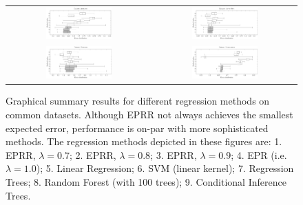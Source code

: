 \documentclass[review,preprint]{elsarticle}
\begin{document}
%
\begin{figure}[tb]\begin{center}
\begin{tabular}{cc}
\includegraphics[width=0.48\textwidth]{Fig3a.pdf}
&
\includegraphics[width=0.48\textwidth]{Fig3b.pdf}
\\
\includegraphics[width=0.48\textwidth]{Fig3c.pdf}
&
\includegraphics[width=0.48\textwidth]{Fig3d.pdf}
\end{tabular}
%
\caption{Graphical summary results for different regression methods on common datasets. Although \ac{EPRR} not always achieves the smallest expected error, performance is on-par with more sophisticated methods.  The regression methods depicted in these figures are:
1. \ac{EPRR}, $\lambda = 0.7$;
2. \ac{EPRR}, $\lambda = 0.8$;
3. \ac{EPRR}, $\lambda = 0.9$;
4. \ac{EPR} (i.e. $\lambda = 1.0$);
5. Linear Regression;
6. \ac{SVM} (linear kernel);
7. Regression Trees;
8. Random Forest (with 100 trees);
9. Conditional Inference Trees.}
\label{fig:four.datasets.summary}
\label{Housing_dataset_lambda0.8_25runs}
\label{Abalone_dataset_lambda0.8_25runs}
\label{Auto-Mpg_dataset_lambda0.8_25runs}
\label{Kinematics300_lambda0.8_25runs}
\end{center}\end{figure}
\end{document}
